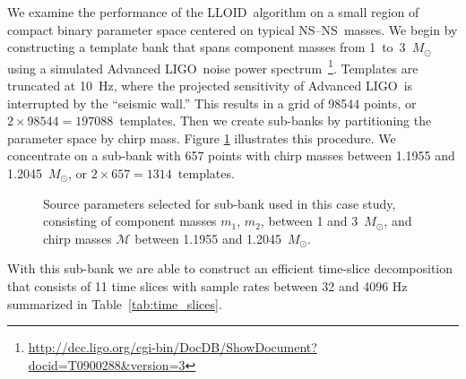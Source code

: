 \documentclass[preprint2]{aastex}
\newcommand{\NS}{NS}
\newcommand{\LIGO}{LIGO}%
\newcommand{\lloid}{LLOID}%
\begin{document}
We examine the performance of the \lloid\ algorithm on a small region of
compact binary parameter space centered on typical \NS--\NS\
masses.  We begin by constructing a template bank that spans component masses
from 1~to~3~$M_\odot$ using a simulated Advanced \LIGO\ noise
power spectrum~\citep{ALIGONoise}\footnote{\url{http://dcc.ligo.org/cgi-bin/DocDB/ShowDocument?docid=T0900288&version=3}}.  Templates are truncated at 10~Hz, where the projected
sensitivity of Advanced \LIGO\ is interrupted by the ``seismic wall.''
This results in a grid of 98544 points, or
$2 \times 98544 = 197088$~templates.  Then we create sub-banks by partitioning
the parameter space by chirp mass.  Figure \ref{fig:tmpltbank} illustrates this
procedure. We concentrate on a sub-bank with 657 points with chirp masses
between 1.1955 and 1.2045~$M_\odot$, or $2 \times 657 = 1314$~templates.
\begin{figure}[h]
	\caption{\label{fig:tmpltbank}Source parameters selected for sub-bank used in this
case study, consisting of component masses $m_1$, $m_2$, between 1 and 3~$M_\odot$, and
chirp masses $\mathcal{M}$ between 1.1955 and 1.2045~$M_\odot$.}
\end{figure}
With this sub-bank we are able to construct an efficient time-slice decomposition
that consists of 11 time slices with sample rates between 32 and 4096 Hz summarized
in Table~\ref{tab:time_slices}.
\end{document}

